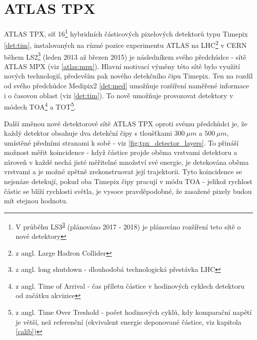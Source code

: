 

\chapter{ATLAS TPX}\label{atlas}
ATLAS TPX, síť 16\footnote{V průběhu LS3\textsuperscript{\ref{ls}} (plánováno 2017 - 2018) je plánováno rozšíření teto sítě o nové detektory} hybridních částicových pixelových detektorů typu Timepix \ref{det:tim}, instalovaných na různé pozice experimentu ATLAS na LHC\footnote{z angl. Large Hadron Collider} v CERN během LS2\footnote{\label{ls}z angl. long shutdown - dlouhodobá technologická přestávka LHC} (leden 2013 až březen 2015) je následníkem svého předchůdce - sítě ATLAS MPX (viz \ref{atlas:mpx}). Hlavní motivací výměny této sítě bylo využití nových technologií, především pak nového detekčního čipu Timepix. Ten na rozdíl od svého předchůdce Medipix2 \ref{det:med} umožňuje rozšíření naměřené informace i o časovou oblast (viz \ref{det:tim}). To nově umožňuje provozovat detektory v módech TOA\footnote{z angl. Time of Arrival - čas příletu částice v hodinových cyklech detektoru od začátku akvizice} a TOT\footnote{z angl. Time Over Treshold - počet hodinových cyklů, kdy komparační napětí je větší, než referenční (ekvivalent energie deponované částice, viz kapitola \ref{calib})}. 

Další změnou nové detektorové sítě ATLAS TPX oproti svému předchůdci je, že každý detektor obsahuje dva detekční čipy s tloušťkami $300~\mu m$ a $500~\mu m$, umístěné předními stranami k sobě - viz \ref{fig:tpx_detector_layers}. To přináší možnost měřit koincidence - když částice projde oběma vrstvami  detektoru a zároveň v každé nechá jisté měřitelné množství své energie, je detekována oběma vrstvami a je možné zpětně zrekonstruovat její trajektorii. Tyto koincidence se nejsnáze detekují, pokud oba Timepix čipy pracují v módu TOA - jelikož rychlost částic se blíží rychlosti světla, je vysoce pravděpodobné, že zasažené pixely budou mít stejnou hodnotu.


